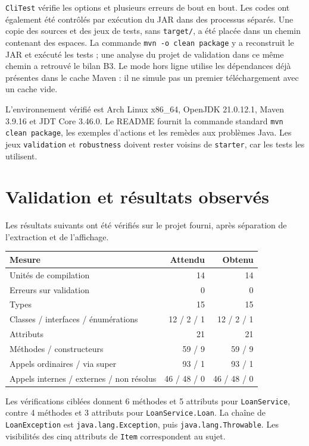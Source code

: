 \documentclass[11pt,a4paper]{article}
\newcommand{\code}[1]{\texttt{#1}}
\begin{document}
\code{CliTest} vérifie les options et plusieurs erreurs de bout en bout. Les codes ont également été contrôlés par exécution du JAR dans des processus séparés. Une copie des sources et des jeux de tests, sans \code{target/}, a été placée dans un chemin contenant des espaces. La commande \code{mvn -o clean package} y a reconstruit le JAR et exécuté les tests ; une analyse du projet de validation dans ce même chemin a retrouvé le bilan B3. Le mode hors ligne utilise les dépendances déjà présentes dans le cache Maven : il ne simule pas un premier téléchargement avec un cache vide.

L'environnement vérifié est Arch Linux x86\_64, OpenJDK 21.0.12.1, Maven 3.9.16 et JDT Core 3.46.0. Le README fournit la commande standard \code{mvn clean package}, les exemples d'actions et les remèdes aux problèmes Java. Les jeux \code{validation} et \code{robustness} doivent rester voisins de \code{starter}, car les tests les utilisent.

\section{Validation et résultats observés}
Les résultats suivants ont été vérifiés sur le projet fourni, après séparation de l'extraction et de l'affichage.
\begin{center}
\begin{tabular}{lrr}
\toprule
Mesure & Attendu & Obtenu\\
\midrule
Unités de compilation & 14 & 14\\
Erreurs sur validation & 0 & 0\\
Types & 15 & 15\\
Classes / interfaces / énumérations & 12 / 2 / 1 & 12 / 2 / 1\\
Attributs & 21 & 21\\
Méthodes / constructeurs & 59 / 9 & 59 / 9\\
Appels ordinaires / via super & 93 / 1 & 93 / 1\\
Appels internes / externes / non résolus & 46 / 48 / 0 & 46 / 48 / 0\\
\bottomrule
\end{tabular}
\end{center}

Les vérifications ciblées donnent 6 méthodes et 5 attributs pour \code{LoanService}, contre 4 méthodes et 3 attributs pour \code{LoanService.Loan}. La chaîne de \code{LoanException} est \code{java.lang.Exception}, puis \code{java.lang.Throwable}. Les visibilités des cinq attributs de \code{Item} correspondent au sujet.
\end{document}

